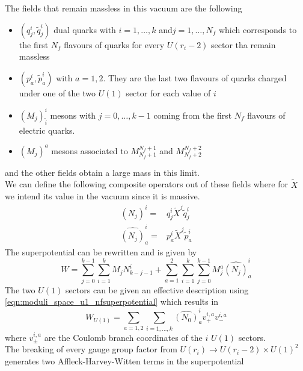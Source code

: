 The fields that remain massless in this vacuum are the following
\begin{itemize}
\item $\left(q_j^{i} , \tilde{q}_j^{i}\right)$ dual quarks with $i=1,\dotsc,k$ and$j=1,\dotsc,N_f$ which corresponds to the first $N_f$ flavours of quarks for every $U(r_i-2)$ sector tha remain massless
\item $\left(p_a^i , \tilde{p}_a^i\right)$ with $a=1,2$. They are the last two flavours of quarks charged under one of the two $U(1)$ sector for each value of $i$
\item $(M_j)^{i}_{\tilde{i}}$ mesons with $j=0,\dotsc,k-1$ coming from the first $N_f$ flavours of electric quarks.
\item $(M_j)^a$ mesons associated to $M^{N_f+1}_{N_f+1}$ and $M^{N_f+2}_{N_f+2}$
\end{itemize}
and the other fields obtain a large mass in this limit.\\
We can define the following composite operators out of these fields where for $\tilde{X}$ we intend its value in the vacuum since it is massive. 
\begin{align}
 (N_j)^i = & q_j^{i} \tilde{X}^j \tilde{q}_j^{i} \\
 \hat{(N_j)}_a^i =& p_a^i \tilde{X}^j \tilde{p}_a^i
\end{align}
The superpotential can be rewritten and is given by
\begin{equation}
W = \sum_{j=0}^{k-1} \sum_{i=1}^{k} M_j 
N_{k-j-1}^i
+
\sum_{a=1}^{2}  \sum_{i=1}^{k} \sum_{j=0}^{k-1} 
M_j^a 
\hat{(N_j)}_a^i
\end{equation}
The two $U(1)$ sectors can be given an effective description using \eqref{eqn:moduli_space_u1_nfsuperpotential} which results in
\begin{equation}
W_{U(1)} = \sum_{a=1,2} \sum_{i=1,\dotsc,k} \hat{(N_0)}_a^i {v}^{i,a}_+ {v}^{i,a}_-
\end{equation}
where ${v}^{i,a}_{\pm}$ are the Coulomb branch coordinates of the $i$  $U(1)$ sectors.\\
The breaking of every gauge group factor from $U(r_i) \rightarrow U(r_i-2) \times U(1)^2$ generates two Affleck-Harvey-Witten terms in the superpotential
